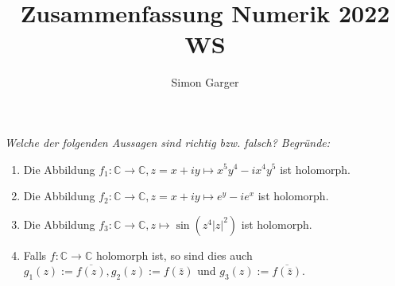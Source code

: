 \documentclass[11pt]{article}
\title{Zusammenfassung Numerik 2022 WS}
\author{Simon Garger}
\newenvironment{problem}[2][Beispiel]{
    \begin{trivlist}
        \item[\hskip \labelsep {\bfseries #1}\hskip \labelsep {\bfseries #2.}] \itshape}{
    \end{trivlist}\normalshape
}
\begin{document}
    \begin{problem}{1}
        Welche der folgenden Aussagen sind richtig bzw. falsch? Begründe:
        \begin{enumerate}[label = (\alph*)]
            \item Die Abbildung $f_1: \mathbb{C} \rightarrow \mathbb{C}, z=x+i y \mapsto x^5 y^4-i x^4 y^5$ ist
            holomorph.
            \item Die Abbildung $f_2: \mathbb{C} \rightarrow \mathbb{C}, z=x+i y \mapsto e^y-i e^x$
            ist holomorph.
            \item Die Abbildung $f_3: \mathbb{C} \rightarrow \mathbb{C}, z
            \mapsto \sin \left(z^4|z|^2\right)$ ist holomorph.
            \item Falls $f: \mathbb{C} \rightarrow \mathbb{C}$ holomorph ist, so sind dies auch
            $g_1(z):=\overline{f(z)}, g_2(z):=f(\bar{z})$ und $g_3(z):=\overline{f(\bar{z})}$.
        \end{enumerate}
    \end{problem}
\end{document}
